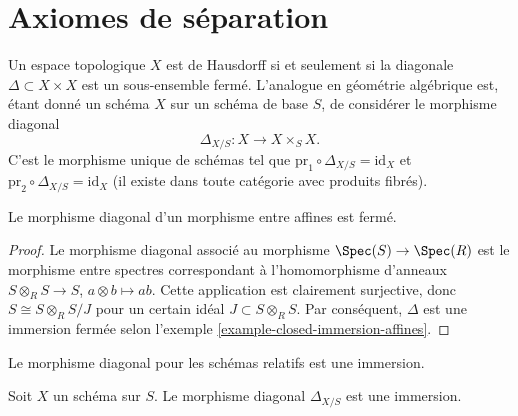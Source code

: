 




























\section{Axiomes de séparation}
\label{section-separation-axioms}

\noindent
Un espace topologique  $X$  est de Hausdorff si et seulement si la
diagonale  $\Delta \subset X \times X$  est un sous-ensemble fermé. L'analogue en géométrie
algébrique est, étant donné un schéma  $X$  sur un schéma de base
 $S$, de considérer le morphisme diagonal
$$
\Delta_{X/S} : X \longrightarrow X \times_S X.
$$
C'est le morphisme unique de schémas tel que  $\text{pr}_1 \circ \Delta_{X/S} = \text{id}_X$  et  $\text{pr}_2 \circ \Delta_{X/S} = \text{id}_X$  (il
existe dans toute catégorie avec produits fibrés).

\begin{lemma}
\label{lemma-diagonal-affines-closed}
Le morphisme diagonal d'un morphisme entre affines est fermé.
\end{lemma}

\begin{proof}
Le morphisme diagonal associé au morphisme  $\Spec(S) \to \Spec(R)$  est le morphisme entre
spectres correspondant à l'homomorphisme d'anneaux  $S \otimes_R S \to S$,  $a \otimes b \mapsto ab$.
Cette application est clairement surjective, donc  $S \cong S \otimes_R S/J$  pour un certain
idéal  $J \subset S \otimes_R S$. Par conséquent,  $\Delta$  est une immersion fermée selon
l'exemple  \ref{example-closed-immersion-affines}.
\end{proof}

\begin{lemma}
\label{lemma-diagonal-immersion}
\begin{slogan}
Le morphisme diagonal pour les schémas relatifs est une immersion.
\end{slogan}
Soit  $X$  un schéma sur  $S$. Le morphisme diagonal  $\Delta_{X/S}$ 
est une immersion.
\end{lemma}

